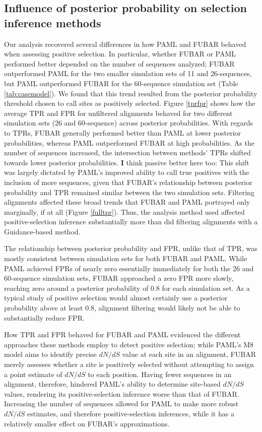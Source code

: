 \documentclass[10pt]{article}
\begin{document}
\subsection*{Influence of posterior probability on selection inference methods}

Our analysis recovered several differences in how PAML and FUBAR behaved when assessing positive selection. In particular, whether FUBAR or PAML performed better depended on the number of sequences analyzed; FUBAR outperformed PAML for the two smaller simulation sets of 11 and 26-sequences, but PAML outperformed FUBAR for the 60-sequence simulation set (Table \ref{tab:casemodel}). We found that this trend resulted from the posterior probability threshold chosen to call sites as positively selected. Figure \ref{tprfpr} shows how the average TPR and FPR for unfiltered alignments behaved for two different simulation sets (26 and 60-sequence) across posterior probabilities. With regards to TPRs,
FUBAR generally performed better than PAML at lower posterior probabilities, whereas PAML outperformed FUBAR at high probabilities. As the number of sequences increased, the intersection between methods' TPRs shifted towards lower posterior probabilities. {\textbf I think passive better here too:} This shift was largely dictated by PAML's improved ability to call true positives with the inclusion of more sequences, given that FUBAR's relationship between posterior probability and TPR remained similar between the two simulation sets.  Filtering alignments affected these broad trends that FUBAR and PAML portrayed only marginally, if at all (Figure \ref{fulltpr}). Thus, the analysis method used affected positive-selection inference substantially more than did filtering  alignments with a Guidance-based method. 

The relationship between posterior probability and FPR, unlike that of TPR, was mostly consistent between simulation sets for both FUBAR and PAML. While PAML achieved FPRs of nearly zero essentially immediately for both the 26 and 60-sequence simulation sets, FUBAR approached a zero FPR more slowly, reaching zero around a posterior probability of 0.8 for each simulation set. As a typical study of positive selection would almost certainly use a posterior probability above at least 0.8, alignment filtering would likely not be able to substantially reduce FPR.

How TPR and FPR behaved for FUBAR and PAML evidenced the different approaches these methods employ to detect positive selection; while PAML's M8 model aims to identify precise $dN/dS$ value at each site in an alignment, FUBAR merely assesses whether a site is positively selected without attempting to assign a point estimate of $dN/dS$ to each position. Having fewer sequences in an alignment, therefore, hindered PAML's ability to determine site-based $dN/dS$ values, rendering its positive-selection inference worse than that of FUBAR. Increasing the number of sequences allowed for PAML to make more robust $dN/dS$ estimates, and therefore positive-selection inferences, while it has a relatively smaller effect on FUBAR's approximations.
\end{document}
